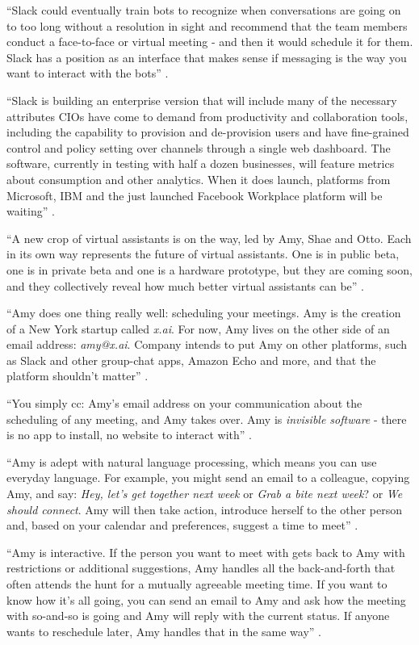 ``Slack could eventually train bots to recognize when conversations are going on to too long without a resolution in sight and recommend that the team members conduct a face-to-face or virtual meeting - and then it would schedule it for them. Slack has a position as an interface that makes sense if messaging is the way you want to interact with the bots'' \cite{Boulton2016assistants}.

``Slack is building an enterprise version that will include many of the necessary attributes CIOs have come to demand from productivity and collaboration tools, including the capability to provision and de-provision users and have fine-grained control and policy setting over channels through a single web dashboard. The software, currently in testing with half a dozen businesses, will feature metrics about consumption and other analytics. When it does launch, platforms from Microsoft, IBM and the just launched Facebook Workplace platform will be waiting'' \cite{Boulton2016assistants}.

``A new crop of virtual assistants is on the way, led by Amy, Shae and Otto. Each in its own way represents the future of virtual assistants. One is in public beta, one is in private beta and one is a hardware prototype, but they are coming soon, and they collectively reveal how much better virtual assistants can be'' \cite{Elgan2016future}.

``Amy does one thing really well: scheduling your meetings. Amy is the creation of a New York startup called {\em x.ai}. For now, Amy lives on the other side of an email address: {\em amy@x.ai}. Company intends to put Amy on other platforms, such as Slack and other group-chat apps, Amazon Echo and more, and that the platform shouldn't matter'' \cite{Elgan2016future}.

``You simply cc: Amy's email address on your communication about the scheduling of any meeting, and Amy takes over. Amy is {\em invisible software} - there is no app to install, no website to interact with'' \cite{Elgan2016future}.

``Amy is adept with natural language processing, which means you can use everyday language. For example, you might send an email to a colleague, copying Amy, and say: {\em Hey, let's get together next week} or {\em Grab a bite next week}? or {\em We should connect}. Amy will then take action, introduce herself to the other person and, based on your calendar and preferences, suggest a time to meet'' \cite{Elgan2016future}.

``Amy is interactive. If the person you want to meet with gets back to Amy with restrictions or additional suggestions, Amy handles all the back-and-forth that often attends the hunt for a mutually agreeable meeting time. If you want to know how it's all going, you can send an email to Amy and ask how the meeting with so-and-so is going and Amy will reply with the current status. If anyone wants to reschedule later, Amy handles that in the same way'' \cite{Elgan2016future}.

